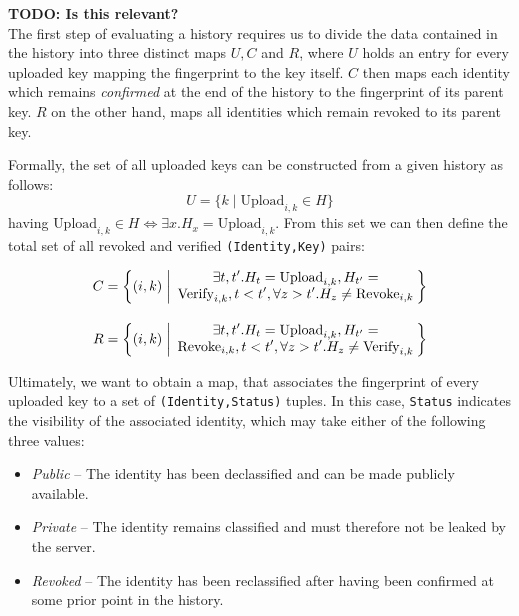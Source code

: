 \textbf{TODO: Is this relevant?} \\
The first step of evaluating a history requires us to divide the data contained in the history into three distinct maps \(U,C\) and \(R\), where \(U\) holds an entry for every uploaded key mapping the fingerprint to the key itself. \(C\) then maps each identity which remains \emph{confirmed} at the end of the history to the fingerprint of its parent key. \(R\) on the other hand, maps all identities which remain revoked to its parent key.

Formally, the set of all uploaded keys can be constructed from a given history as follows:
\newcommand{\pctext}[2]{\text{\parbox{#1}{\centering #2}}}
\[U = \biggl \{k \;\bigg|\; \text{Upload}_{i,k} \in H \biggr\}\]
having \(\text{Upload}_{i,k} \in H \Leftrightarrow \exists x. H_x = \text{Upload}_{i,k}\). 
From this set we can then define the total set of all revoked and verified \texttt{(Identity,Key)} pairs:

\begin{equation}
    \label{eq:states}
    \begin{alignedat}{2}
        C &= \biggl \{(i,k) &&\;\bigg|\; \pctext{2.4in}{\(\exists t,t'. H_t = \text{Upload}_{i,k},H_{t'} = \text{Verify}_{i,k}, t < t', \forall z > t'. H_z \neq \text{Revoke}_{i,k}\)}  \biggr \} \\[10pt]
        R &= \biggl \{(i,k) &&\;\bigg|\; \pctext{2.4in}{\(\exists t,t'. H_t = \text{Upload}_{i,k},H_{t'} = \text{Revoke}_{i,k}, t < t', \forall z > t'. H_z \neq \text{Verify}_{i,k}\)}  \biggr \}
    \end{alignedat}
\end{equation}

Ultimately, we want to obtain a map, that associates the fingerprint of every uploaded key to a set of \texttt{(Identity,Status)} tuples. In this case, \texttt{Status} indicates the visibility of the associated identity, which may take either of the following three values: 
\begin{itemize}
    \item \emph{Public} -- The identity has been declassified and can be made publicly available.
    \item \emph{Private} -- The identity remains classified and must therefore not be leaked by the server.
    \item \emph{Revoked} -- The identity has been reclassified after having been confirmed at some prior point in the history.
\end{itemize}

